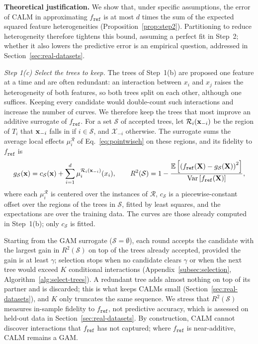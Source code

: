 \textbf{Theoretical justification.}
We show that, under specific assumptions, the error of CALM in approximating $f_{\texttt{ref}}$ is at most $d$ times the sum of the expected squared feature heterogeneities (Proposition~\ref{prop:step2}).
Partitioning to reduce heterogeneity therefore tightens this bound, assuming a perfect fit in Step~2; whether it also lowers the predictive error is an empirical question, addressed in Section~\ref{sec:real-datasets}.

\textit{Step 1(c) Select the trees to keep.}
The trees of Step~1(b) are proposed one feature at a time and are often redundant: an interaction between $x_i$ and $x_j$ raises the heterogeneity of both features, so both trees split on each other, although one suffices.
Keeping every candidate would double-count such interactions and increase the number of curves.
We therefore keep the trees that most improve an additive surrogate of $f_{\texttt{ref}}$.
For a set $\mathcal{S}$ of accepted trees, let $\mathcal{R}_i(\mathbf{x}_{-i})$ be the region of $T_i$ that $\mathbf{x}_{-i}$ falls in if $i \in \mathcal{S}$, and $\mathcal{X}_{-i}$ otherwise.
The surrogate sums the average local effects $\mu_i^{\mathcal{R}}$ of Eq.~\eqref{eq:pointwiseh} on these regions, and its fidelity to $f_{\texttt{ref}}$ is
\begin{equation}
\label{eq:surrogate-r2}
g_{\mathcal{S}}(\mathbf{x}) = c_{\mathcal{S}}(\mathbf{x}) + \sum_{i=1}^d \mu_i^{\mathcal{R}_i(\mathbf{x}_{-i})}(x_i),
\qquad
R^2(\mathcal{S}) = 1 - \frac{\mathbb{E}\left[\left(f_{\texttt{ref}}(\mathbf{X}) - g_{\mathcal{S}}(\mathbf{X})\right)^2\right]}{\mathrm{Var}\left[f_{\texttt{ref}}(\mathbf{X})\right]},
\end{equation}
where each $\mu_i^{\mathcal{R}}$ is centered over the instances of $\mathcal{R}$, $c_{\mathcal{S}}$ is a piecewise-constant offset over the regions of the trees in $\mathcal{S}$, fitted by least squares, and the expectations are over the training data.
The curves are those already computed in Step~1(b); only $c_{\mathcal{S}}$ is fitted.

Starting from the GAM surrogate ($\mathcal{S} = \emptyset$), each round accepts the candidate with the largest gain in $R^2(\mathcal{S})$ on top of the trees already accepted, provided the gain is at least $\gamma$; selection stops when no candidate clears $\gamma$ or when the next tree would exceed $K$ conditional interactions (Appendix~\ref{subsec:selection}, Algorithm~\ref{alg:select-trees}).
A redundant tree adds almost nothing on top of its partner and is discarded; this is what keeps CALMs small (Section~\ref{sec:real-datasets}), and $K$ only truncates the same sequence.
We stress that $R^2(\mathcal{S})$ measures in-sample fidelity to $f_{\texttt{ref}}$, not predictive accuracy, which is assessed on held-out data in Section~\ref{sec:real-datasets}.
By construction, CALM cannot discover interactions that $f_{\texttt{ref}}$ has not captured; where $f_{\texttt{ref}}$ is near-additive, CALM remains a GAM.

